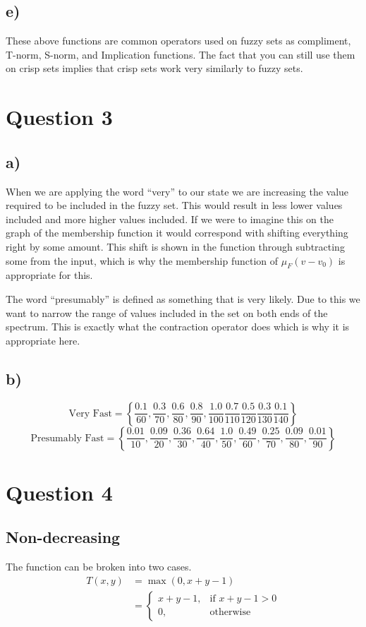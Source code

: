\documentclass{article}
\begin{document}
\subsection*{e)}
These above functions are common operators used on fuzzy sets as compliment, T-norm, S-norm, and Implication functions. The fact that you can still use them on crisp sets implies that crisp sets work very similarly to fuzzy sets.


\section*{Question 3}
\subsection*{a)}
When we are applying the word ``very'' to our state we are increasing the value required to be included in the fuzzy set. This would result in less lower values included and more higher values included. If we were to imagine this on the graph of the membership function it would correspond with shifting everything right by some amount. This shift is shown in the function through subtracting some from the input, which is why the membership function of $\mu_F(v-v_0)$ is appropriate for this.

The word ``presumably'' is defined as something that is very likely. Due to this we want to narrow the range of values included in the set on both ends of the spectrum. This is exactly what the contraction operator does which is why it is appropriate here.

\subsection*{b)}
\[
	\text{Very Fast} = \left\{
		\frac{0.1}{60},
		\frac{0.3}{70},
		\frac{0.6}{80},
		\frac{0.8}{90},
		\frac{1.0}{100}
		\frac{0.7}{110}
		\frac{0.5}{120}
		\frac{0.3}{130}
		\frac{0.1}{140}
	\right\}
\]
\[
	\text{Presumably Fast} = \left\{
		\frac{0.01}{10},
		\frac{0.09}{20},
		\frac{0.36}{30},
		\frac{0.64}{40},
		\frac{1.0}{50},
		\frac{0.49}{60},
		\frac{0.25}{70},
		\frac{0.09}{80},
		\frac{0.01}{90}
	\right\}
\]

\section*{Question 4}

\subsection*{Non-decreasing}
The function can be broken into two cases.
\begin{align*}
	T(x,y) &= \max(0, x+y-1)\\
	&=
	\begin{cases}
		x+y-1, & \text{if } x+y-1 > 0 \\
		0, & \text{otherwise}
	\end{cases}
\end{align*}
\end{document}
